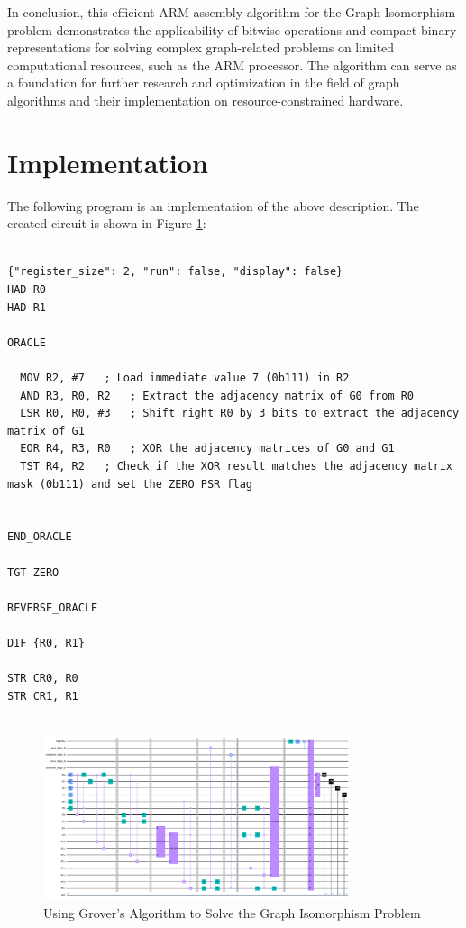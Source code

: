 In conclusion, this efficient ARM assembly algorithm for the Graph Isomorphism problem demonstrates the applicability of bitwise operations and compact binary representations for solving complex graph-related problems on limited computational resources, such as the ARM processor. The algorithm can serve as a foundation for further research and optimization in the field of graph algorithms and their implementation on resource-constrained hardware.



\section{Implementation}

The following program is an implementation of the above description. The created circuit is shown in Figure \ref{fig:Graph_Isomorphism}:

\begin{lstlisting}

{"register_size": 2, "run": false, "display": false}
HAD R0
HAD R1

ORACLE

  MOV R2, #7   ; Load immediate value 7 (0b111) in R2
  AND R3, R0, R2   ; Extract the adjacency matrix of G0 from R0
  LSR R0, R0, #3   ; Shift right R0 by 3 bits to extract the adjacency matrix of G1
  EOR R4, R3, R0   ; XOR the adjacency matrices of G0 and G1
  TST R4, R2   ; Check if the XOR result matches the adjacency matrix mask (0b111) and set the ZERO PSR flag


END_ORACLE

TGT ZERO

REVERSE_ORACLE

DIF {R0, R1}

STR CR0, R0
STR CR1, R1


\end{lstlisting}

\begin{figure}[htp]
    \centering
    \includegraphics[width=9cm]{Figures/Graph_Isomorphism_circuit.png}
    \caption{Using Grover's Algorithm to Solve the Graph Isomorphism Problem}
    \label{fig:Graph_Isomorphism}
\end{figure}

